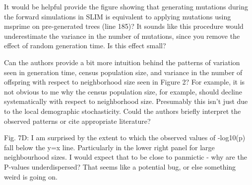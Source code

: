 \begin{point}{}
    It would be helpful provide the figure showing that generating mutations during the forward simulations in SLIM is equivalent to applying mutations using msprime on pre-generated trees (line 185)? It sounds like this procedure would underestimate the variance in the number of mutations, since you remove the effect of random generation time. Is this effect small?
\end{point}


\begin{point}{}
    Can the authors provide a bit more intuition behind the patterns of variation seen in generation time, census population size, and variance in the number of offspring with respect to neighborhood size seen in Figure 2? For example, it is not obvious to me why the census population size, for example, should decline systematically with respect to neighborhood size. Presumably this isn't just due to the local demographic stochasticity. Could the authors briefly interpret the observed patterns or cite appropriate literature?
\end{point}


\begin{point}{}
    Fig. 7D: I am surprised by the extent to which the observed values of -log10(p) fall below the y=x line. Particularly in the lower right panel for large neighbourhood sizes. I would expect that to be close to panmictic - why are the P-values underdispersed? That seems like a potential bug, or else something weird is going on.
\end{point}


